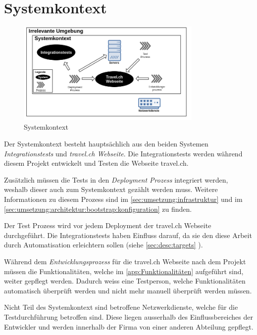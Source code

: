\section{Systemkontext}
\begin{figure}[H]
	\centering
	\includegraphics[width=0.8\textwidth]{images/Semesterarbeit Systemkontext.png}
	\caption{Systemkontext}
	\label{fig:analyse:systemkontext}
\end{figure}
Der Systemkontext besteht hauptsächlich aus den beiden Systemen \textit{Integrationstests} und \textit{travel.ch Webseite}. Die Integrationstests werden während diesem Projekt entwickelt und Testen die Webseite travel.ch.

Zusätzlich müssen die Tests in den \textit{Deployment Prozess} integriert werden, weshalb dieser auch zum Systemkontext gezählt werden muss. Weitere Informationen zu diesem Prozess sind im \cref{sec:umsetzung:infrastruktur}  und im \cref{sec:umsetzung:architektur:bootstrap:konfiguration}  zu finden.

Der Test Prozess wird vor jedem Deployment der travel.ch Webseite durchgeführt. Die Integrationstests haben Einfluss darauf, da sie den diese Arbeit durch Automatisation erleichtern sollen (siehe \cref{sec:desc:targets} ).

Während dem \textit{Entwicklungsprozess} für die travel.ch Webseite nach dem Projekt müssen die Funktionalitäten, welche im \cref{app:Funktionalitäten}  aufgeführt sind, weiter gepflegt werden. Dadurch weiss eine Testperson, welche Funktionalitäten automatisch überprüft werden und nicht mehr manuell überprüft werden müssen.

Nicht Teil des Systemkontext sind betroffene Netzwerkdienste, welche für die Testdurchführung betroffen sind. Diese liegen ausserhalb des Einflussbereiches der Entwickler und werden innerhalb der Firma von einer anderen Abteilung gepflegt.

